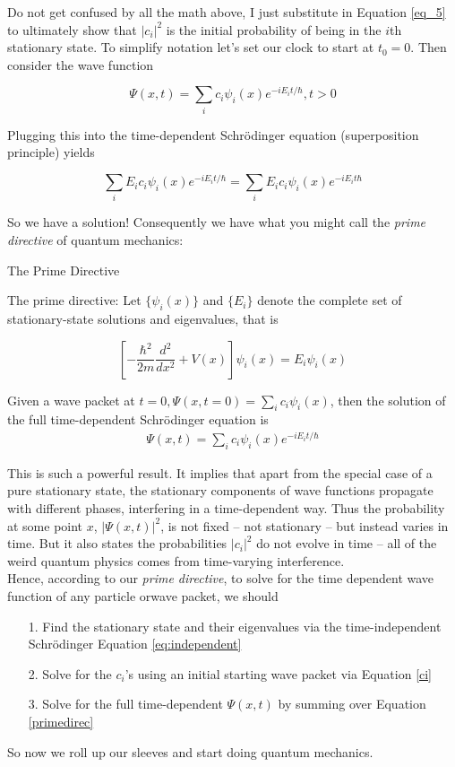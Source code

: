 Do not get confused by all the math above, I just substitute in Equation
\ref{eq_5} to ultimately show that $|c_i|^2$ is the initial probability of
being in the $i$th stationary state. To simplify notation let's set our clock
to start at $t_0 = 0$. Then consider the wave function 

\[ \Psi(x, t) = \sum_i c_i \psi_i(x) e^{-iE_i t/\hbar}, t > 0 \] 


Plugging this into the time-dependent Schr\"odinger equation (superposition
principle) yields 

\[
  \sum_i E_i c_i \psi_i(x) e^{-iE_i t/\hbar} = \sum_i E_i c_i \psi_i(x)
  e^{-iE_i t\hbar}
\] \vspace{3px}

So we have a solution! Consequently we have what you might call the
\textit{prime directive} of quantum mechanics: 

\begin{subbox}{The Prime Directive}
  
    The prime directive: Let $\{\psi_i(x)\}$ and $\{E_i\}$ denote the
    complete set of stationary-state solutions and eigenvalues, that is 

    \[
    \left[ -\frac{\hbar^2}{2m} \frac{d^2 }{d x^2} + V(x) \right] \psi_i(x)
    = E_i \psi_i(x) 
  \] \vspace{3px}

  Given a wave packet at $t=0, \Psi(x, t = 0) = \sum_i c_i \psi_i(x)$,
    then the solution of the full time-dependent Schr\"odinger equation is
    \begin{align}\label{primedirec}
    \Psi(x, t) = \sum_i c_i \psi_i(x) e^{-iE_i t/\hbar}
  \end{align}
\end{subbox}

This is such a powerful result. It implies that apart from the special case of a pure stationary state,
the stationary components of wave functions propagate with different phases,
interfering in a time-dependent way. Thus the probability at some point $x$,
$|\Psi(x, t)|^2$, is not fixed -- not stationary --
but instead varies in time. But it also states the probabilities $|c_i|^2$ do
not evolve in time -- all of the weird quantum physics comes from time-varying interference.\\

Hence, according to our \textit{prime directive}, to solve for the time
dependent wave function of any particle orwave packet, we should 

\begin{itemize}
  \item[1.] Find the stationary state and their eigenvalues via the
    time-independent Schr\"odinger Equation \ref{eq:independent}
  \item[2.] Solve for the $c_i$'s using an initial starting wave packet via
    Equation \ref{ci}
  \item[3.] Solve for the full time-dependent $\Psi(x, t)$ by summing over
    Equation \ref{primedirec}
\end{itemize} 

So now we roll up our sleeves and start doing quantum mechanics. 

